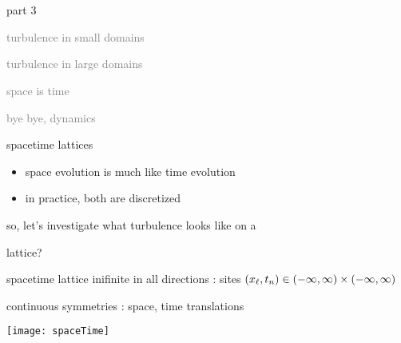 \section[\catlatt]
{\catlatt}
\begin{frame}{part 3}
\begin{enumerate}
              \item
    \textcolor{gray}{\small
turbulence in small domains
              \item
turbulence in large domains
        }
              \item
    {\Large
\catlatt
    }\textcolor{gray}{\small
              \item
space is time
              \item
bye bye, dynamics
                    }
            \end{enumerate}
\end{frame}

\begin{frame}{spacetime lattices}
\begin{center}
\begin{itemize}
  \item space evolution is much like time evolution
  \item in practice, both are discretized
\end{itemize}

\medskip
so, let's investigate what turbulence looks like on a

\bigskip\hfill
{\huge lattice?}
\end{center}
\end{frame}

\begin{frame}{
spacetime lattice
             }
inifinite in all directions :
 sites $(x_\ell,t_n) \in (-\infty, \infty)\times (-\infty, \infty)$

\bigskip
continuous symmetries : space, time translations

\medskip
\begin{center}
\texttt{[image: spaceTime]}
\end{center}
\end{frame}

